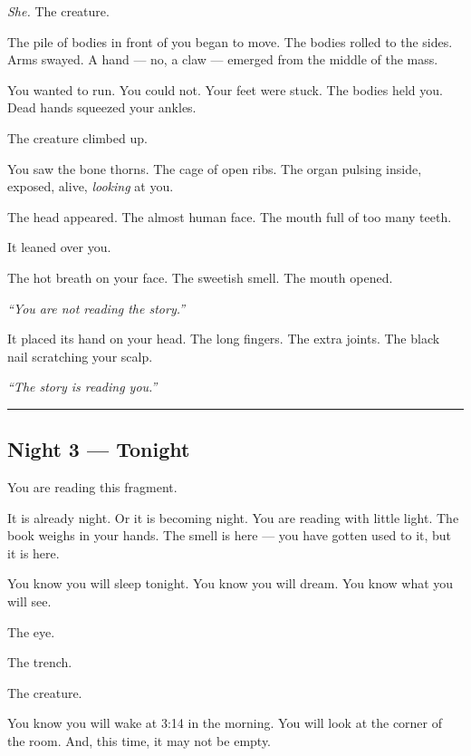 \noindent \textit{She.} The creature.

\noindent The pile of bodies in front of you began to move. The bodies rolled to the sides. Arms swayed. A hand --- no, a claw --- emerged from the middle of the mass.

\noindent You wanted to run. You could not. Your feet were stuck. The bodies held you. Dead hands squeezed your ankles.

\noindent The creature climbed up.

\noindent You saw the bone thorns. The cage of open ribs. The organ pulsing inside, exposed, alive, \textit{looking} at you.

\noindent The head appeared. The almost human face. The mouth full of too many teeth.

\noindent It leaned over you.

\noindent The hot breath on your face. The sweetish smell. The mouth opened.

\noindent \textit{\textquotedblleft{}You are not reading the story.\textquotedblright{}}

\noindent It placed its hand on your head. The long fingers. The extra joints. The black nail scratching your scalp.

\noindent \textit{\textquotedblleft{}The story is reading you.\textquotedblright{}}

\vspace{0.5em}\noindent\rule{\textwidth}{0.5pt}\vspace{0.5em}

\subsection*{Night 3 --- Tonight}

\noindent You are reading this fragment.

\noindent It is already night. Or it is becoming night. You are reading with little light. The book weighs in your hands. The smell is here --- you have gotten used to it, but it is here.

\noindent You know you will sleep tonight. You know you will dream. You know what you will see.

\noindent The eye.

\noindent The trench.

\noindent The creature.

\noindent You know you will wake at 3:14 in the morning. You will look at the corner of the room. And, this time, it may not be empty.

